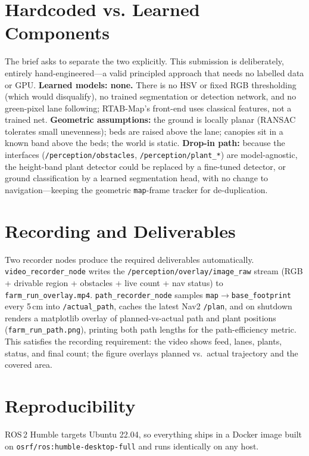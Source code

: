 \documentclass[10pt,journal,twoside]{IEEEtran}
\begin{document}
\section{Hardcoded vs. Learned Components}
The brief asks to separate the two explicitly. This submission is deliberately, entirely hand-engineered---a valid principled approach that needs no labelled data or GPU. \textbf{Learned models: none.} There is no HSV or fixed RGB thresholding (which would disqualify), no trained segmentation or detection network, and no green-pixel lane following; RTAB-Map's front-end uses classical features, not a trained net. \textbf{Geometric assumptions:} the ground is locally planar (RANSAC tolerates small unevenness); beds are raised above the lane; canopies sit in a known band above the beds; the world is static. \textbf{Drop-in path:} because the interfaces (\texttt{/perception/obstacles}, \texttt{/perception/plant\_*}) are model-agnostic, the height-band plant detector could be replaced by a fine-tuned detector, or ground classification by a learned segmentation head, with no change to navigation---keeping the geometric \texttt{map}-frame tracker for de-duplication.

\section{Recording and Deliverables}
Two recorder nodes produce the required deliverables automatically. \texttt{video\_recorder\_node} writes the \texttt{/perception/overlay/image\_raw} stream (RGB + drivable region + obstacles + live count + nav status) to \texttt{farm\_run\_overlay.mp4}. \texttt{path\_recorder\_node} samples \texttt{map$\rightarrow$base\_footprint} every 5\,cm into \texttt{/actual\_path}, caches the latest Nav2 \texttt{/plan}, and on shutdown renders a matplotlib overlay of planned-vs-actual path and plant positions (\texttt{farm\_run\_path.png}), printing both path lengths for the path-efficiency metric. This satisfies the recording requirement: the video shows feed, lanes, plants, status, and final count; the figure overlays planned vs.\ actual trajectory and the covered area.

\section{Reproducibility}
ROS\,2 Humble targets Ubuntu 22.04, so everything ships in a Docker image built on \texttt{osrf/ros:humble-desktop-full} and runs identically on any host.
\end{document}
